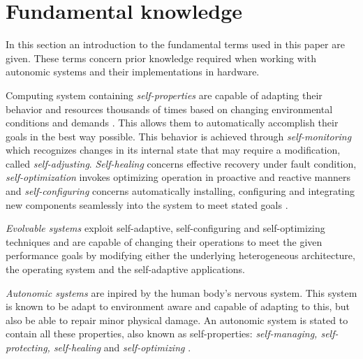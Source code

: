 
\section{Fundamental knowledge}
\label{sec:fundamental}

In this section an introduction to the fundamental terms used in this paper are given. These terms concern prior knowledge required when working with autonomic systems and their implementations in hardware. 

Computing system containing \emph{self-properties} are capable of adapting their behavior and resources thousands of times based on changing environmental conditions and demands \cite{selfaware}. This allows them to automatically accomplish their goals in the best way possible. This behavior is achieved through \emph{self-monitoring} which recognizes changes in its internal state that may require a modification, called \emph{self-adjusting}. \emph{Self-healing} concerns effective recovery under fault condition, \emph{self-optimization} invokes optimizing operation in proactive and reactive manners and \emph{self-configuring} concerns automatically installing, configuring and integrating new components seamlessly into the system to meet stated goals \cite{autocom}. 

\emph{Evolvable systems} exploit self-adaptive, self-configuring and self-optimizing techniques and are capable of changing their operations to meet the given performance goals by modifying either the underlying heterogeneous architecture, the operating system and the self-adaptive applications. \cite{evolvable}



\emph{Autonomic systems} are inpired by the human body's nervous system. This system is known to be adapt to environment aware and capable of adapting to this, but also be able to repair minor physical damage. An autonomic system is stated to contain all these properties, also known as self-properties: \emph{self-managing, self-protecting, self-healing} and \emph{self-optimizing} \cite{autonomic}. 